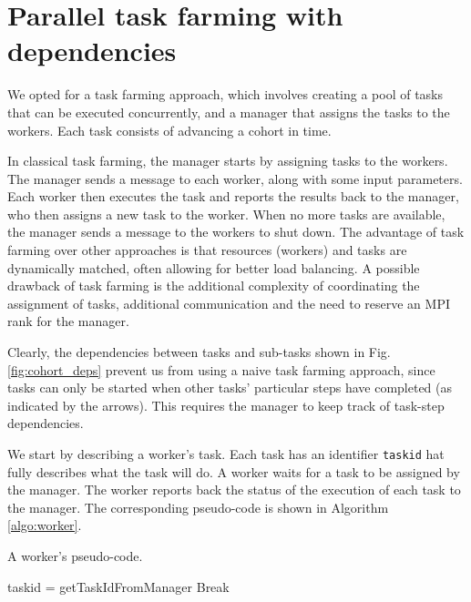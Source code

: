 \documentclass[a4paper,oneside,12pt]{article}
\begin{document}
\section{Parallel task farming with dependencies}

We opted for a task farming approach, which involves creating a pool of tasks that can be executed concurrently,
and a manager that assigns the tasks to the workers. Each task consists of advancing a cohort in time.

In classical task farming, the manager starts by assigning tasks to the workers. The manager sends a message to each worker, along with 
some input parameters. Each worker then executes the task and reports the results back to the manager, who then assigns a new task to the worker. 
When no more tasks are available, the manager sends a message to the workers to shut down. The advantage of task farming over other approaches is
that resources (workers) and tasks are dynamically matched, often allowing for better load balancing. A possible drawback of task farming is the 
additional complexity of coordinating the assignment of tasks, additional communication and the need to reserve an MPI rank for the manager.

Clearly, the dependencies between tasks and sub-tasks shown in Fig. \ref{fig:cohort_deps} prevent us from using a naive task farming approach,
since tasks can only be started when other tasks' particular steps have completed
(as indicated by the arrows). This requires the manager to keep track of task-step dependencies.

We start by describing a worker's task. Each task has an identifier \verb|taskid| hat fully describes what the task will do.
A worker waits for a task to be assigned by the manager. 
The worker reports back the status of the execution of each task to the manager. 
The corresponding pseudo-code is shown in Algorithm \ref{algo:worker}.

\begin{algorithm}
\caption{A worker's pseudo-code.}
    \begin{algorithmic}[1] %

        taskid = \Call getTaskIdFromManager{}
            Break
        \EndIf

        \State {}

        \State {}
    
    \EndWhile
\end{algorithmic}
\label{algo:worker}
\end{algorithm}
\end{document}
